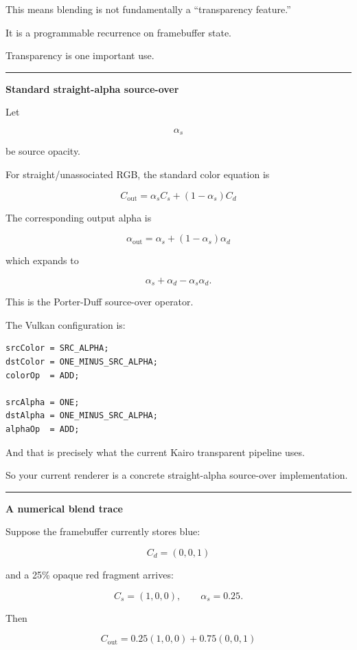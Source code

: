 This means blending is not fundamentally a ``transparency feature.''

It is a programmable recurrence on framebuffer state.

Transparency is one important use.

\begin{center}\rule{0.5\linewidth}{0.5pt}\end{center}

\textbf{Standard straight-alpha source-over}

Let

\[
\alpha_s
\]

be source opacity.

For straight/unassociated RGB, the standard color equation is

\[
\boxed{
C_{\text{out}}
=
\alpha_s C_s
+
(1-\alpha_s)C_d
}
\]

The corresponding output alpha is

\[
\boxed{
\alpha_{\text{out}}
=
\alpha_s+
(1-\alpha_s)\alpha_d
}
\]

which expands to

\[
\alpha_s+\alpha_d-\alpha_s\alpha_d.
\]

This is the Porter-Duff source-over operator.

The Vulkan configuration is:

\begin{verbatim}
srcColor = SRC_ALPHA;
dstColor = ONE_MINUS_SRC_ALPHA;
colorOp  = ADD;

srcAlpha = ONE;
dstAlpha = ONE_MINUS_SRC_ALPHA;
alphaOp  = ADD;
\end{verbatim}

And that is precisely what the current Kairo transparent pipeline uses.

So your current renderer is a concrete straight-alpha source-over implementation.

\begin{center}\rule{0.5\linewidth}{0.5pt}\end{center}

\textbf{A numerical blend trace}

Suppose the framebuffer currently stores blue:

\[
C_d=(0,0,1)
\]

and a 25\% opaque red fragment arrives:

\[
C_s=(1,0,0),\qquad \alpha_s=0.25.
\]

Then

\[
C_{\text{out}}
=
0.25(1,0,0)
+
0.75(0,0,1)
\]

